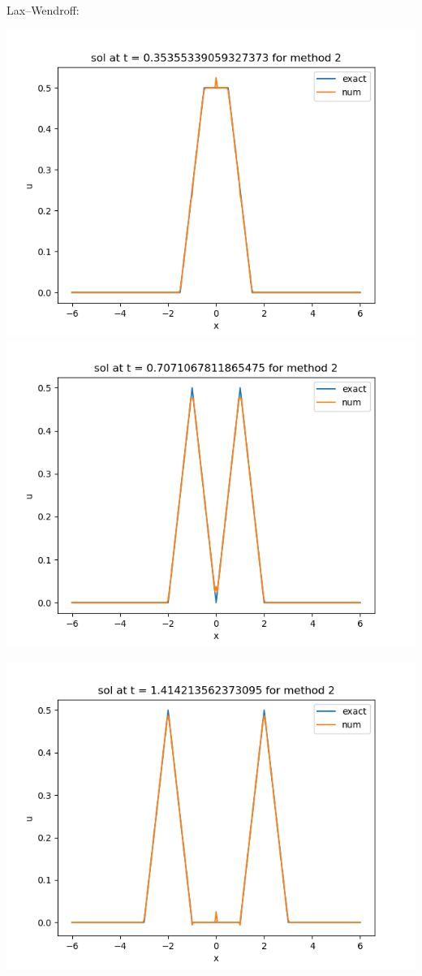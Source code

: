 \documentclass{article}
\begin{document}
\begin{enumerate}[label=(\alph*)]
Lax--Wendroff:
\begin{center}
	\includegraphics[scale=.3]{hw11 sol n = 10 method 2}
	\includegraphics[scale=.3]{hw11 sol n = 20 method 2}
\end{center}
\begin{center}
	\includegraphics[scale=.3]{hw11 sol n = 40 method 2}

\end{center}
\end{enumerate}
\end{document}
